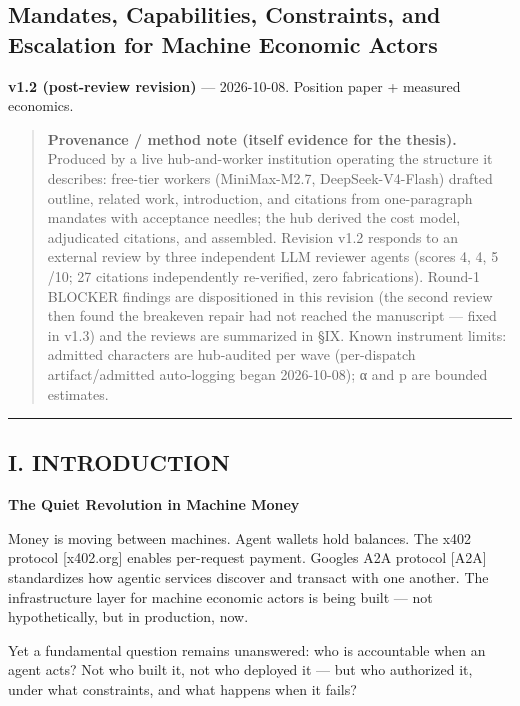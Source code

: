\documentclass[
]{article}
\begin{document}
\subsection{Mandates, Capabilities, Constraints, and Escalation for
Machine Economic
Actors}\label{mandates-capabilities-constraints-and-escalation-for-machine-economic-actors}

\textbf{v1.2 (post-review revision)} --- 2026-10-08. Position paper +
measured economics.

\begin{quote}
\textbf{Provenance / method note (itself evidence for the thesis).}
Produced by a live hub-and-worker institution operating the structure it
describes: free-tier workers (MiniMax-M2.7, DeepSeek-V4-Flash) drafted
outline, related work, introduction, and citations from one-paragraph
mandates with acceptance needles; the hub derived the cost model,
adjudicated citations, and assembled. Revision v1.2 responds to an
external review by three independent LLM reviewer agents (scores 4, 4, 5
/10; 27 citations independently re-verified, zero fabrications). Round-1
BLOCKER findings are dispositioned in this revision (the second review
then found the breakeven repair had not reached the manuscript --- fixed
in v1.3) and the reviews are summarized in §IX. Known instrument limits:
admitted characters are hub-audited per wave (per-dispatch
artifact/admitted auto-logging began 2026-10-08); α and p are bounded
estimates.
\end{quote}

\begin{center}\rule{0.5\linewidth}{0.5pt}\end{center}

\subsection{I. INTRODUCTION}\label{i-introduction}

\textbf{The Quiet Revolution in Machine Money}

Money is moving between machines. Agent wallets hold balances. The x402
protocol {[}x402.org{]} enables per-request payment.
Google\textquotesingle s A2A protocol {[}A2A{]} standardizes how agentic
services discover and transact with one another. The infrastructure
layer for machine economic actors is being built --- not hypothetically,
but in production, now.

Yet a fundamental question remains unanswered: who is accountable when
an agent acts? Not who built it, not who deployed it --- but who
authorized it, under what constraints, and what happens when it fails?
\end{document}

